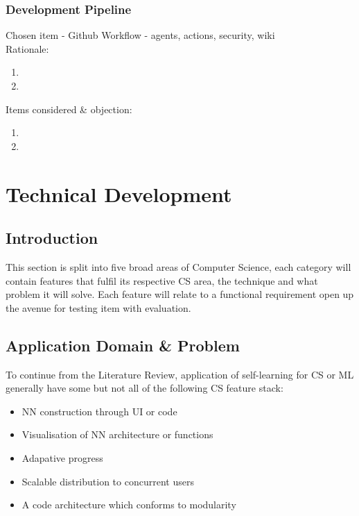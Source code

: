 \documentclass{article}
\begin{document}
\subsubsection{Development Pipeline} %
Chosen item - Github Workflow - agents, actions, security, wiki \\
\large{Rationale:} \\
\begin{enumerate}
    \item 
    \item
\end{enumerate}
\large{Items considered \& objection:} \\
\begin{enumerate}
    \item 
    \item
\end{enumerate}

\section{Technical Development} %

\subsection{Introduction}
This section is split into five broad areas of Computer Science, each category will contain features that fulfil its respective CS area, the technique and what problem it will solve. Each feature will relate to a functional requirement open up the avenue for testing item with evaluation.

\subsection{Application Domain \& Problem}
To continue from the Literature Review, application of self-learning for CS or ML generally have some but not all of the following CS feature stack:
\begin{itemize}
    \item NN construction through UI or code
    \item Visualisation of NN architecture or functions
    \item Adapative progress
    \item Scalable distribution to concurrent users
    \item A code architecture which conforms to modularity
\end{itemize}
\end{document}
